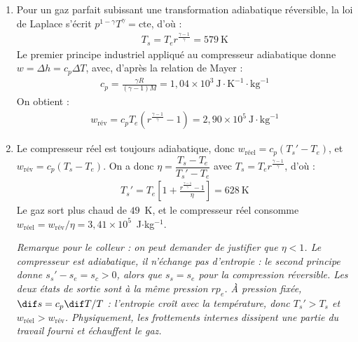 \begin{correction}

\begin{enumerate}

	\item Pour un gaz parfait subissant une transformation adiabatique réversible, la loi de Laplace s'écrit $p^{1-\gamma}T^{\gamma}=\text{cte}$, d'où :
	\begin{align*}
		\boxed{T_s=T_er^{\frac{\gamma-1}{\gamma}}}=579~\text{K}
	\end{align*}
	Le premier principe industriel appliqué au compresseur adiabatique donne $w=\Delta h=c_p\Delta T$, avec, d'après la relation de Mayer :
	\begin{align*}
		c_p=\frac{\gamma R}{(\gamma-1)M}=1{,}04\times10^{3}~\text{J}\cdot\text{K}^{-1}\cdot\text{kg}^{-1}
	\end{align*}
	On obtient :
	\begin{align*}
		\boxed{w_{\text{rév}}=c_pT_e\left(r^{\frac{\gamma-1}{\gamma}}-1\right)}=2{,}90\times10^{5}~\text{J}\cdot\text{kg}^{-1}
	\end{align*}

	\item Le compresseur réel est toujours adiabatique, donc $w_{\text{réel}}=c_p(T_s'-T_e)$, et $w_{\text{rév}}=c_p(T_s-T_e)$. On a donc $\eta=\dfrac{T_s-T_e}{T_s'-T_e}$ avec $T_s=T_er^{\frac{\gamma-1}{\gamma}}$, d'où :
	\begin{align*}
		\boxed{T_s'=T_e\left[1+\frac{r^{\frac{\gamma-1}{\gamma}}-1}{\eta}\right]}=628~\text{K}
	\end{align*}
	Le gaz sort plus chaud de $49$~K, et le compresseur réel consomme $w_{\text{réel}}=w_{\text{rév}}/\eta=3{,}41\times10^{5}$~J$\cdot$kg$^{-1}$.

	\textit{Remarque pour le colleur : on peut demander de justifier que $\eta<1$. Le compresseur est adiabatique, il n'échange pas d'entropie : le second principe donne $s_s'-s_e=s_c>0$, alors que $s_s=s_e$ pour la compression réversible. Les deux états de sortie sont à la même pression $rp_e$. À pression fixée, $\dif s=c_p\dif T/T$ : l'entropie croît avec la température, donc $T_s'>T_s$ et $w_{\text{réel}}>w_{\text{rév}}$. Physiquement, les frottements internes dissipent une partie du travail fourni et échauffent le gaz.}


\end{enumerate}
\end{correction}
